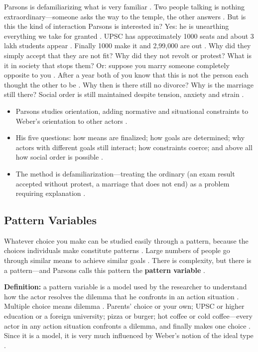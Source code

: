 \begin{ExampleBox}
Parsons is defamiliarizing what is very familiar . Two people talking is nothing extraordinary---someone asks the way to the temple, the other answers . But is this the kind of interaction Parsons is interested in? Yes: he is unearthing everything we take for granted .
UPSC has approximately 1000 seats and about 3 lakh students appear . Finally 1000 make it and 2,99,000 are out . Why did they simply accept that they are not fit? Why did they not revolt or protest? What is it in society that stops them? 
Or: suppose you marry someone completely opposite to you . After a year both of you know that this is not the person each thought the other to be . Why then is there still no divorce? Why is the marriage still there? Social order is still maintained despite tension, anxiety and strain .
\end{ExampleBox}

\begin{QuickRevision}
\begin{itemize}
    \item Parsons studies orientation, adding normative and situational constraints to Weber's orientation to other actors .
    \item His five questions: how means are finalized; how goals are determined; why actors with different goals still interact; how constraints coerce; and above all how social order is possible .
    \item The method is defamiliarization---treating the ordinary (an exam result accepted without protest, a marriage that does not end) as a problem requiring explanation .
\end{itemize}
\end{QuickRevision}

\subsection{Pattern Variables}
Whatever choice you make can be studied easily through a pattern, because the choices individuals make constitute patterns . Large numbers of people go through similar means to achieve similar goals . There is complexity, but there is a pattern---and Parsons calls this pattern the \textbf{pattern variable} .

\begin{KeyConcept}
\textbf{Definition:} a pattern variable is a model used by the researcher to understand how the actor resolves the dilemma that he confronts in an action situation .
Multiple choice means dilemma . Parents' choice or your own; UPSC or higher education or a foreign university; pizza or burger; hot coffee or cold coffee---every actor in any action situation confronts a dilemma, and finally makes one choice .
Since it is a model, it is very much influenced by Weber's notion of the ideal type .
\end{KeyConcept}

